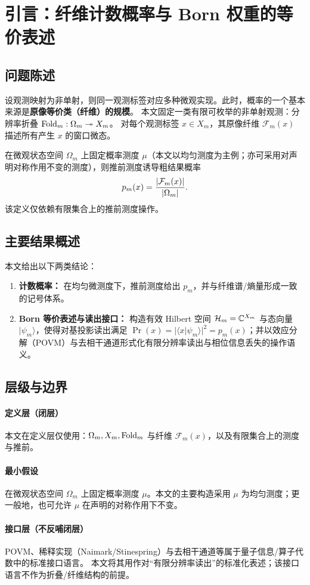 \section{引言：纤维计数概率与 Born 权重的等价表述}

\subsection{问题陈述}

设观测映射为非单射，则同一观测标签对应多种微观实现。此时，概率的一个基本来源是\textbf{原像等价类（纤维）的规模}。
本文固定一类有限可枚举的非单射观测：分辨率折叠 $\mathrm{Fold}_m:\Omega_m\twoheadrightarrow X_m$。
对每个观测标签 $x\in X_m$，其原像纤维 $\mathcal F_m(x)$ 描述所有产生 $x$ 的窗口微态。

在微观状态空间 $\Omega_m$ 上固定概率测度 $\mu$（本文以均匀测度为主例；亦可采用对声明对称作用不变的测度），则推前测度诱导粗结果概率
$$
p_m(x)=\frac{\left\lvert \mathcal F_m(x)\right\rvert}{\left\lvert \Omega_m\right\rvert}.
$$
该定义仅依赖有限集合上的推前测度操作。

\subsection{主要结果概述}

本文给出以下两类结论：
\begin{enumerate}
  \item \textbf{计数概率：} 在均匀微测度下，推前测度给出 $p_m$，并与纤维谱/熵量形成一致的记号体系。
  \item \textbf{Born 等价表述与读出接口：} 构造有效 Hilbert 空间 $\mathcal H_m=\mathbb{C}^{X_m}$ 与态向量 $|\psi_m\rangle$，使得对基投影读出满足 $\Pr(x)=|\langle x|\psi_m\rangle|^2=p_m(x)$；并以效应分解（POVM）与去相干通道形式化有限分辨率读出与相位信息丢失的操作语义。
\end{enumerate}

\subsection{层级与边界}

\paragraph{定义层（闭层）}
本文在定义层仅使用：$\Omega_m,X_m,\mathrm{Fold}_m$ 与纤维 $\mathcal F_m(x)$，以及有限集合上的测度与推前。

\paragraph{最小假设}
\begin{assumption}[均匀微测度或对称不变微测度]
\label{ass:uniform_micro_measure}
在微观状态空间 $\Omega_m$ 上固定概率测度 $\mu$。本文的主要构造采用 $\mu$ 为均匀测度；更一般地，也可允许 $\mu$ 在声明的对称作用下不变。
\end{assumption}

\paragraph{接口层（不反哺闭层）}
POVM、稀释实现（Naimark/Stinespring）与去相干通道等属于量子信息/算子代数中的标准接口语言。
本文将其用作对“有限分辨率读出”的标准化表述；该接口语言不作为折叠/纤维结构的前提。

